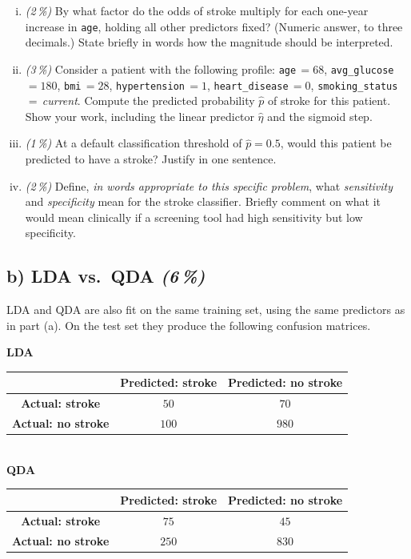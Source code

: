 \documentclass[11pt,a4paper]{article}
\newcommand{\subpoints}[1]{\textit{(#1\,\%)}}
\begin{document}
\begin{enumerate}[(i)]
  \item \subpoints{2} By what factor do the odds of stroke multiply for each one-year increase in \texttt{age}, holding all other predictors fixed? (Numeric answer, to three decimals.) State briefly in words how the magnitude should be interpreted.
  \item \subpoints{3} Consider a patient with the following profile: \texttt{age}\,$=68$, \texttt{avg\_glucose}\,$=180$, \texttt{bmi}\,$=28$, \texttt{hypertension}\,$=1$, \texttt{heart\_disease}\,$=0$, \texttt{smoking\_status}\,$=$\,\emph{current}. Compute the predicted probability $\hat p$ of stroke for this patient. Show your work, including the linear predictor $\hat\eta$ and the sigmoid step.
  \item \subpoints{1} At a default classification threshold of $\hat p = 0.5$, would this patient be predicted to have a stroke? Justify in one sentence.
  \item \subpoints{2} Define, \emph{in words appropriate to this specific problem}, what \emph{sensitivity} and \emph{specificity} mean for the stroke classifier. Briefly comment on what it would mean clinically if a screening tool had high sensitivity but low specificity.
\end{enumerate}

\subsection*{b) LDA vs.\ QDA \subpoints{6}}

LDA and QDA are also fit on the same training set, using the same predictors as in part (a). On the test set they produce the following confusion matrices.

\begin{center}\small
\textbf{LDA} \\[0.3em]
\begin{tabular}{c|cc}
 & \textbf{Predicted: stroke} & \textbf{Predicted: no stroke} \\ \hline
\textbf{Actual: stroke}    & $50$  & $70$  \\
\textbf{Actual: no stroke} & $100$ & $980$ \\
\end{tabular}\\[0.6em]

\textbf{QDA} \\[0.3em]
\begin{tabular}{c|cc}
 & \textbf{Predicted: stroke} & \textbf{Predicted: no stroke} \\ \hline
\textbf{Actual: stroke}    & $75$  & $45$  \\
\textbf{Actual: no stroke} & $250$ & $830$ \\
\end{tabular}
\end{center}
\end{document}
